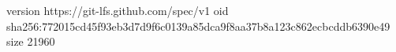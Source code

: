 version https://git-lfs.github.com/spec/v1
oid sha256:772015cd45f93eb3d7d9f6c0139a85dca9f8aa37b8a123c862ecbcddb6390e49
size 21960
